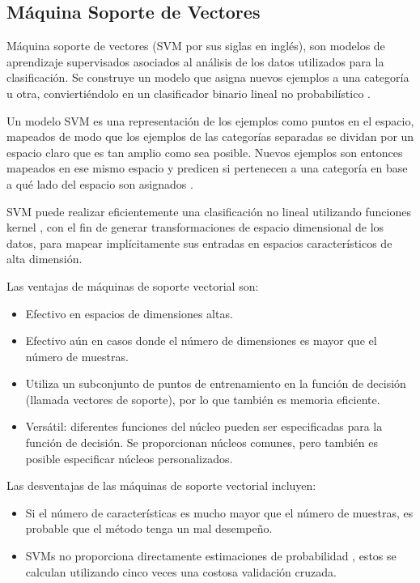 \subsection{Máquina Soporte de Vectores}

Máquina soporte de vectores (SVM por sus siglas en inglés), son modelos de aprendizaje supervisados asociados al análisis de los datos utilizados para la clasificación. Se construye un modelo que asigna nuevos ejemplos a una categoría u otra, conviertiéndolo en un clasificador binario lineal no probabilístico \cite{scholkopf2001learning}. 

Un modelo SVM es una representación de los ejemplos como puntos en el espacio, mapeados de modo que los ejemplos de las categorías separadas se dividan por un espacio claro que es tan amplio como sea posible. Nuevos ejemplos son entonces mapeados en ese mismo espacio y predicen si pertenecen a una categoría en base a qué lado del espacio son asignados \cite{scholkopf2001learning}.

SVM puede realizar eficientemente una clasificación no lineal utilizando funciones kernel \cite{amari1999improving}, con el fin de generar transformaciones de espacio dimensional de los datos, para mapear implícitamente sus entradas en espacios característicos de alta dimensión.

Las ventajas de máquinas de soporte vectorial son:

\begin{itemize}
	
	\item Efectivo en espacios de dimensiones altas.
	\item Efectivo aún en casos donde el número de dimensiones es mayor que el número de
	muestras.
	\item Utiliza un subconjunto de puntos de entrenamiento en la función de decisión (llamada
	vectores de soporte), por lo que también es memoria eficiente.
	\item Versátil: diferentes funciones del núcleo pueden ser especificadas para la función de decisión.
	Se proporcionan núcleos comunes, pero también es posible especificar núcleos
	personalizados.
	
\end{itemize}

Las desventajas de las máquinas de soporte vectorial incluyen:

\begin{itemize}
	
	\item Si el número de características es mucho mayor que el número de muestras, es probable que
	el método tenga un mal desempeño.
	\item SVMs no proporciona directamente estimaciones de probabilidad \cite{wu2004probability}, estos se calculan utilizando
	cinco veces una costosa validación cruzada.
	
\end{itemize}

